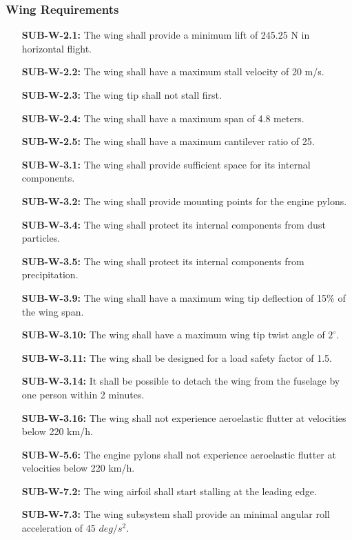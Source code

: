 \subsubsection{Wing Requirements}

\begin{enumerate}[leftmargin =3.5cm, align=parleft, labelwidth=8em]
    \item[\textbf{SUB-W-2.1:}] The wing shall provide a minimum lift of 245.25 N in horizontal flight.
    \item[\textbf{SUB-W-2.2:}] The wing shall have a maximum stall velocity of 20 m/s.
    \item[\textbf{SUB-W-2.3:}] The wing tip shall not stall first.
    \item[\textbf{SUB-W-2.4:}] The wing shall have a maximum span of 4.8 meters.
    \item[\textbf{SUB-W-2.5:}] The wing shall have a maximum cantilever ratio of 25.
    \item[\textbf{SUB-W-3.1:}] The wing shall provide sufficient space for its internal components.
    \item[\textbf{SUB-W-3.2:}] The wing shall provide mounting points for the engine pylons. 
    \item[\textbf{SUB-W-3.4:}] The wing shall protect its internal components from dust particles.
    \item[\textbf{SUB-W-3.5:}] The wing shall protect its internal components from precipitation.
    \item[\textbf{SUB-W-3.9:}] The wing shall have a maximum wing tip deflection of 15\% of the wing span.
    \item[\textbf{SUB-W-3.10:}] The wing shall have a maximum wing tip twist angle of $2^{\circ}$.    
    \item[\textbf{SUB-W-3.11:}] The wing shall be designed for a load safety factor of 1.5.
    \item[\textbf{SUB-W-3.14:}] It shall be possible to detach the wing from the fuselage by one person within 2 minutes.
    \item[\textbf{SUB-W-3.16:}] The wing shall not experience aeroelastic flutter at velocities below 220 km/h.
    \item[\textbf{SUB-W-5.6:}] The engine pylons shall not experience aeroelastic flutter at velocities below 220 km/h.
    \item[\textbf{SUB-W-7.2:}] The wing airfoil shall start stalling at the leading edge.
    \item[\textbf{SUB-W-7.3:}] The wing subsystem shall provide an minimal angular roll acceleration of 45 $deg/s^{2}$.   
\end{enumerate}

